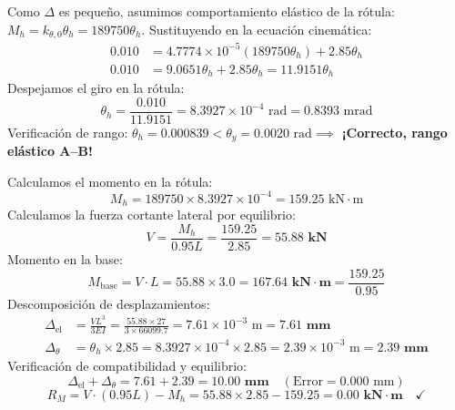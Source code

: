 \documentclass[11pt,letterpaper]{article}
\begin{document}
\begin{examplebox}
Como $\Delta$ es pequeño, asumimos comportamiento elástico de la rótula: $M_h = k_{\theta,0} \theta_h = 189750 \theta_h$.
Sustituyendo en la ecuación cinemática:
\begin{align}
0.010 &= 4.7774 \times 10^{-5} (189750 \theta_h) + 2.85 \theta_h \nonumber\\
0.010 &= 9.0651 \theta_h + 2.85 \theta_h = 11.9151 \theta_h
\end{align}
Despejamos el giro en la rótula:
\begin{equation}
\theta_h = \frac{0.010}{11.9151} = 8.3927 \times 10^{-4}\text{ rad} = 0.8393\text{ mrad}
\end{equation}
Verificación de rango: $\theta_h = 0.000839 < \theta_y = 0.0020\text{ rad} \implies$ \textbf{¡Correcto, rango elástico A--B!}

Calculamos el momento en la rótula:
\begin{equation}
M_h = 189750 \times 8.3927 \times 10^{-4} = 159.25\text{ kN}\cdot\text{m}
\end{equation}
Calculamos la fuerza cortante lateral por equilibrio:
\begin{equation}
V = \frac{M_h}{0.95 L} = \frac{159.25}{2.85} = \mathbf{55.88\text{ kN}}
\end{equation}
Momento en la base:
\begin{equation}
M_{\text{base}} = V \cdot L = 55.88 \times 3.0 = \mathbf{167.64\text{ kN}\cdot\text{m}} = \frac{159.25}{0.95}
\end{equation}
Descomposición de desplazamientos:
\begin{align}
\Delta_{\text{el}} &= \frac{V L^3}{3 E I} = \frac{55.88 \times 27}{3 \times 66099.7} = 7.61 \times 10^{-3}\text{ m} = \mathbf{7.61\text{ mm}}\\
\Delta_{\theta} &= \theta_h \times 2.85 = 8.3927 \times 10^{-4} \times 2.85 = 2.39 \times 10^{-3}\text{ m} = \mathbf{2.39\text{ mm}}
\end{align}
Verificación de compatibilidad y equilibrio:
\begin{equation}
\Delta_{\text{el}} + \Delta_{\theta} = 7.61 + 2.39 = \mathbf{10.00\text{ mm}} \quad (\text{Error} = 0.000\text{ mm})
\end{equation}
\begin{equation}
R_M = V \cdot (0.95 L) - M_h = 55.88 \times 2.85 - 159.25 = \mathbf{0.00\text{ kN}\cdot\text{m}} \quad \checkmark
\end{equation}
\end{examplebox}
\end{document}
